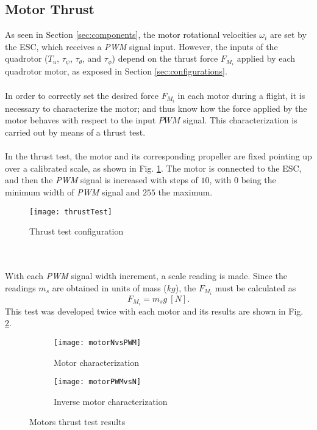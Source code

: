 \subsection{Motor Thrust}
As seen in Section \ref{sec:components}, the motor rotational velocities $\omega_{i}$ are set by the ESC, which receives a \textit{PWM} signal input. However, the inputs of the quadrotor ($T_u$, $\tau_\psi$, $\tau_\theta$, and $\tau_\phi$) depend on the thrust force $F_{M_{i}}$ applied by each quadrotor motor, as exposed in Section \ref{sec:configurations}.
\\\\
In order to correctly set the desired force $F_{M_{i}}$ in each motor during a flight, it is necessary to characterize the motor; and thus know how the force applied by the motor behaves with respect to the input $PWM$ signal. This characterization is carried out by means of a thrust test.
\\\\
In the thrust test, the motor and its corresponding propeller are fixed pointing up over a calibrated scale, as shown in Fig. \ref{fig:thrusttest}. The motor is connected to the ESC, and then the \textit{PWM} signal is increased with steps of $10$, with $0$ being the minimum width of \textit{PWM} signal and $255$ the maximum. 
\begin{figure}[h]
	\begin{center}
		\texttt{[image: thrustTest]}    
		\caption{Thrust test configuration} 
		\label{fig:thrusttest}
	\end{center}
\end{figure}
\\\\With each  \textit{PWM} signal width increment, a scale reading is made. Since the readings $m_{s}$ are obtained in units of mass ($kg$), the $F_{M_i}$ must be calculated as
\begin{equation}
F_{M_i} = m_{s}g\ [N].
\end{equation}
This test was developed twice with each motor and its results are shown in Fig. \ref{fig:motor}.
\begin{figure}[H]
\begin{subfigure}{.5\linewidth}
\centering
\texttt{[image: motorNvsPWM]}
\caption{Motor characterization}
\label{fig:motor}
\end{subfigure}%
\begin{subfigure}{.5\linewidth}
\centering
\texttt{[image: motorPWMvsN]}
\caption{Inverse motor characterization}
\label{fig:inversemotor}
\end{subfigure}
\caption{Motors thrust test results}
\label{fig:test}
\end{figure}
